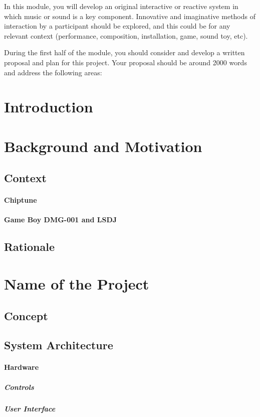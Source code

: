 \documentclass[]{article}
\author{Silvio Gregorini}
\title{}
\date{2019}
\begin{document}
    In this module, you will develop an original interactive or reactive system
 in which music or sound is a key component. Innovative and imaginative
  methods of interaction by a participant should be explored, and this
   could be for any relevant context (performance, composition, installation,
    game, sound toy, etc).
    
During the first half of the module, you should consider and develop a 
written proposal and plan for this project. Your proposal should be around 
2000 words and address the following areas:


\section{Introduction}

\section{Background and Motivation}
    \subsection{Context} %
        \paragraph{Chiptune}
        \paragraph{Game Boy DMG-001 and LSDJ} %
    \subsection{Rationale} %


\section{Name of the Project} %
    \subsection{Concept}
    \subsection{System Architecture}
        \paragraph{Hardware}
            \subparagraph{Controls}
            \subparagraph{User Interface}
\end{document}
